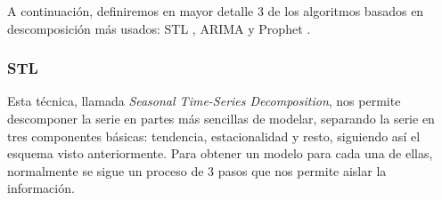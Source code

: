 A continuación, definiremos en mayor detalle 3 de los algoritmos basados en descomposición más usados: STL \cite{cleveland1990stl}, ARIMA \cite{box1970time} y Prophet \cite{taylor2018prophet}.

\subsubsection{STL}

Esta técnica, llamada \textit{Seasonal Time-Series Decomposition}, nos permite descomponer la serie en partes más sencillas de modelar, separando la serie en tres componentes básicas: tendencia, estacionalidad y resto, siguiendo así el esquema visto anteriormente. Para obtener un modelo para cada una de ellas,  normalmente se sigue un proceso de 3 pasos que nos permite aislar la información.

